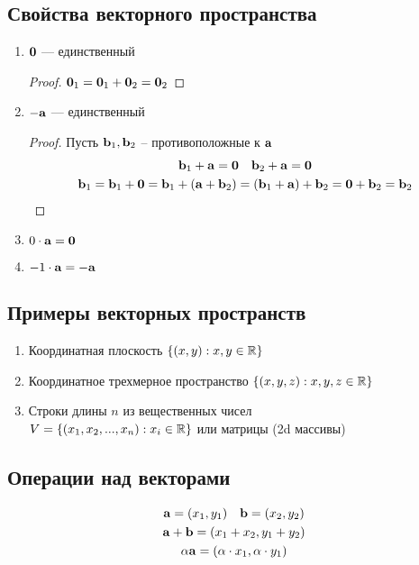 \documentclass[main]{subfiles}
\begin{document}
\subsection{Свойства векторного пространства}

\begin{enumerate}
    \item $\mathbf{0}$ --- единственный \begin{proof}
              $\mathbf{0}_1 = \mathbf{0}_1 + \mathbf{0}_2 = \mathbf{0}_2$
          \end{proof}
    \item $-\mathbf{a}$ --- единственный \begin{proof}
              Пусть $\mathbf{b}_1, \mathbf{b}_2$ -- противоположные к $\mathbf{a}$
              \begin{gather*}
                  \mathbf{b}_1 + \mathbf{a} = \mathbf{0} \quad \mathbf{b}_2 + \mathbf{a} = \mathbf{0}\\
                  \mathbf{b}_1 = \mathbf{b}_1 + \mathbf{0} = \mathbf{b}_1 + (\mathbf{a} + \mathbf{b}_2) = (\mathbf{b}_1+\mathbf{a})+\mathbf{b}_2 = \mathbf{0} +\mathbf{b}_2 = \mathbf{b}_2
              \end{gather*}
          \end{proof}
    \item $0\cdot \mathbf{a} = \mathbf{0}$
    \item $-1\cdot \mathbf{a} = -\mathbf{a}$
\end{enumerate}

\subsection{Примеры векторных пространств}
\begin{enumerate}
    \item Координатная плоскость $\{(x,y): x,y\in \mathbb{R}\}$
    \item Координатное трехмерное пространство $\{(x,y,z): x,y,z\in \mathbb{R}\}$
    \item Строки длины $n$ из вещественных чисел \\
          $V = \{(x_1, x_2, ..., x_n): x_i \in \mathbb{R}\}$ или матрицы (2d массивы)
\end{enumerate}

\subsection{Операции над векторами}
\begin{gather*}
    \mathbf{a} = (x_1, y_1) \quad \mathbf{b} = (x_2, y_2)\\
    \mathbf{a} + \mathbf{b} = (x_1+x_2, y_1+y_2)\\
    \alpha \mathbf{a} = (\alpha\cdot x_1, \alpha\cdot y_1)
\end{gather*}
\end{document}
